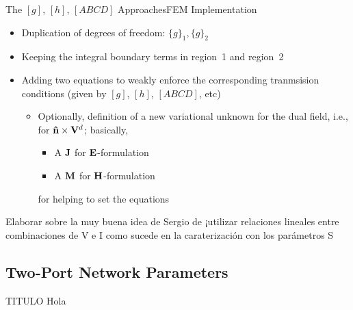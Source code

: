 \begin{frame}[allowframebreaks]{The $[g]$, $[h]$, $[ABCD]$
    Approaches}{FEM Implementation}

  \begin{itemize}
  \item Duplication of degrees of freedom:
    $\lbrace g\rbrace_1,\lbrace g\rbrace_2$
  \item Keeping the integral boundary terms in region~1 and region~2

  \item Adding two equations to weakly enforce the corresponding
    tranmsision conditions (given by $[g]$, $[h]$, $[ABCD]$, etc)
    
    \begin{itemize}
    \item  Optionally, definition of a new variational unknown
      for the dual field, i.e., for $\mathbf{\hat{n}}\times\mathbf{V}^d$; basically,
    \begin{itemize}
    \item A $\mathbf{J}$ for $\mathbf{E}$-formulation
    \item A $\mathbf{M}$ for $\mathbf{H}$-formulation
    \end{itemize}
    for helping to set the equations
  \end{itemize}

    
    
  \end{itemize}

  
\end{frame}


  \begin{frame}[plain]
    \centering \Large{Elaborar sobre la muy buena idea de Sergio de ¡utilizar
      relaciones lineales entre combinaciones de V e I como sucede en
      la caraterización con los parámetros S}
    
  \end{frame}



\subsection{Two-Port Network Parameters}

\begin{frame}{TITULO}
  Hola
\end{frame}


